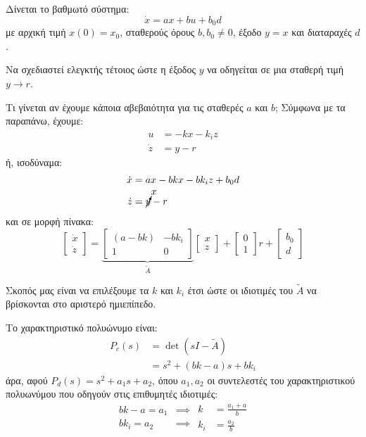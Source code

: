 \documentclass[11pt,a4paper,notitlepage,fleqn]{article}
\begin{document}
\begin{exercise}
	Δίνεται το βαθμωτό σύστημα:\[
	\dot x = ax+bu+b_0d
	\]
	με αρχική τιμή \( x(0) = x_0 \), σταθερούς όρους \( b,b_0\neq 0 \),
	έξοδο \( y=x \) και διαταραχές \( d \).
	
	Να σχεδιαστεί ελεγκτής τέτοιος ώστε η έξοδος \( y \) να οδηγείται
	σε μια σταθερή τιμή \( y\to r \).
	
	Τι γίνεται αν έχουμε κάποια αβεβαιότητα για τις σταθερές
	\( a \) και \( b \);
	\tcblower
	Σύμφωνα με τα παραπάνω, έχουμε:
	\begin{align*}
		u &= -kx - k_i z\\
		\dot z &= y-r
	\end{align*}
	ή, ισοδύναμα:
	\begin{align*}
		\dot x &= ax - bkx - bk_i z + b_0 d \\
		\dot z &= \cancelto{x}{y}-r
	\end{align*}
	και σε μορφή πίνακα:
	\[
	\left[\begin{matrix}
	\dot x \\ \dot z
	\end{matrix}\right]
	= \underbrace{\left[\begin{matrix}
		(a-bk) & -bk_i \\ 1 & 0
		\end{matrix}\right]}_{\tilde A}\left[\begin{matrix}
	x \\ z
	\end{matrix}\right] + \left[\begin{matrix}
	0 \\ 1
	\end{matrix}\right]r + \left[\begin{matrix}
	b_0 \\ d
	\end{matrix}\right]
	\]
	
	Σκοπός μας είναι να επιλέξουμε τα \( k \) και \( k_i \) έτσι ώστε
	οι ιδιοτιμές του \( \tilde A \) να βρίσκονται στο αριστερό ημιεπίπεδο.
	
	Το χαρακτηριστικό πολυώνυμο είναι:
	\begin{align*}
	 P_c(s) &= \det(sI-\tilde A)
		\\ &= s^2 + (bk-a)s + bk_i
	\end{align*}
	άρα, αφού \( P_d(s) = s^2+a_1s+a_2 \), όπου \( a_1,a_2 \) οι
	συντελεστές του χαρακτηριστικού πολυωνύμου που οδηγούν
	στις επιθυμητές ιδιοτιμές:
	\[ \begin{aligned}
		bk-a = a_1 &\implies \\
		bk_i = a_2 &\implies
		\end{aligned}\boxed{\begin{aligned}
			k &= \frac{a_1+a}{b} \\
			k_i &= \frac{a_2}{b}
			\end{aligned}}
	\]
	

\end{exercise}
\end{document}
